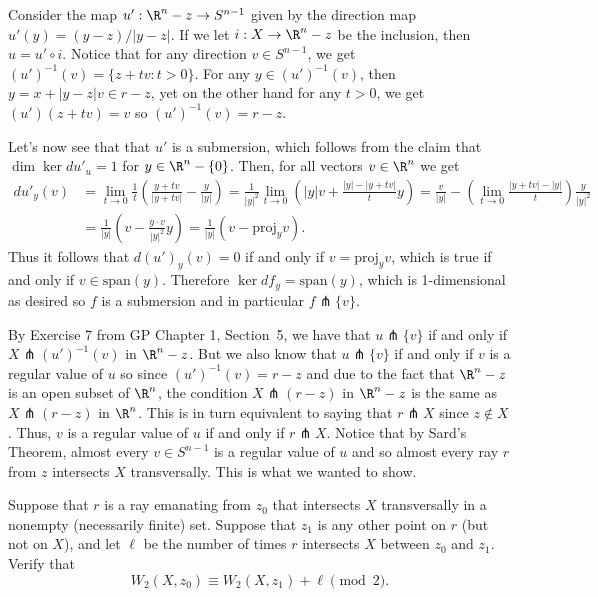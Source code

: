\documentclass[11pt,letterpaper]{article}
\begin{document}
\begin{solution}
    \quad Consider the map $u' : \R^n-z \to S^{n-1}$ given by the direction map $u'(y) = (y-z) / |y-z|$. If we let $i : X\to \R^n-z$ be the inclusion, then $u=u'\circ i$. Notice that for any direction $v\in S^{n-1}$, we get $(u')^{-1}(v) = \{z+tv : t > 0\}$. For any $y\in (u')^{-1}(v)$, then $y=x+|y-z|v\in r-z$, yet on the other hand for any $t>0$, we get $(u')(z+tv)=v$ so $(u')^{-1}(v)=r-z$.

    \quad Let's now see that that $u'$ is a submersion, which follows from the claim that $\dim \ker du'_u=1$ for $y\in \R^n-\{0\}$. Then, for all vectors $v\in \R^n$ we get
        \[
    \begin{aligned}
    du'_y(v) &= \lim_{t \to 0} \frac{1}{t}\left(\frac{y+tv}{|y+tv|}-\frac{y}{|y|}\right) = \frac{1}{|y|^2}\lim_{t \to 0} \left(|y|v +\frac{|y|-|y+tv|}{t}y\right) = \frac{v}{|y|}-\left(\lim_{t\to 0} \frac{|y+tv|-|y|}{t}\right)\frac{y}{|y|^2}\\
    &=\frac{1}{|y|}\left(v - \frac{y\cdot v}{|y|^2}y\right) = \frac{1}{|y|}(v-\mathrm{proj}_yv).
    \end{aligned}
    \]
    Thus it follows that $d(u')_y(v)=0$ if and only if $v = \mathrm{proj}_y v$, which is true if and only if $v \in \mathrm{span}(y)$. Therefore $\ker df_y = \mathrm{span}(y)$, which is 1-dimensional as desired so $f$ is a submersion and in particular $f \pitchfork \{v\}$.

    \quad By Exercise 7 from GP Chapter 1, Section~5, we have that $u \pitchfork \{v\}$ if and only if $X \pitchfork (u')^{-1}(v)$ in $\R^n-z$. But we also know that $u \pitchfork \{v\}$ if and only if $v$ is a regular value of $u$ so since $(u')^{-1}(v) = r-z$ and due to the fact that $\R^n-z$ is an open subset of $\R^n$, the condition $X \pitchfork (r-z)$ in $\R^n-z$ is the same as $X \pitchfork (r-z)$ in $\R^n$. This is in turn equivalent to saying that $r\pitchfork X$ since $z \notin X$. Thus, $v$ is a regular value of $u$ if and only if $r\pitchfork X$. Notice that by Sard's Theorem, almost every $v \in S^{n-1}$ is a regular value of $u$ and so almost every ray $r$ from $z$ intersects $X$ transversally. This is what we wanted to show.
\end{solution}

\begin{problem}
Suppose that $r$ is a ray emanating from $z_0$ that intersects $X$ transversally in a nonempty (necessarily finite) set. Suppose that $z_1$ is any other point on $r$ (but not on $X$), and let $\ell$ be the number of times $r$ intersects $X$ between $z_0$ and $z_1$. Verify that 
\[
W_2(X,z_0) \equiv W_2(X,z_1)+\ell \pmod 2.
\]
\end{problem}
\end{document}
